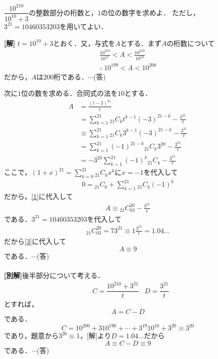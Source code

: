 \documentclass[a4j]{jarticle}
\begin{document}

     \begin{oframed}
     $\dfrac{10^{210}}{10^10+3}$の整数部分の桁数と，$1$の位の数字を求めよ．
     ただし，$3^{21}=10460353203$を用いてよい．
     \end{oframed}

\setlength{\columnseprule}{0.4pt}
\begin{multicols}{2}
{\bf[解]} $t=10^{10}+3$とおく．又，与式を$A$とする．まず$A$の桁数について
     \begin{align*}
     \frac{10^{210}}{10^{11}}<A<\frac{10^{210}}{10^{10}} \\
     \therefore \,10^{199}<A<10^{200}
     \end{align*}
だから，$A$は$200$桁である．$\cdots$(答)

次に$1$位の数を求める．合同式の法を$10$とする．
     \begin{align*}
     A&=\frac{(t-3)^{21}}{t}     \\
     &=\sum_{k=1}^{21}{}_{21}C_kt^{k-1}(-3)^{21-k}-\frac{3^21}{t} \\
     &\equiv \sum_{k=1}^{21}{}_{21}C_k3^{k-1}(-3)^{21-k}-\frac{3^21}{t} \tag{$\because t\equiv 3$}\\
     &=\sum_{k=1}^{21}(-1)^{21-k}{}_{21}C_k3^{20}-\frac{3^21}{t} \\
     &=-3^{20}\sum_{k=1}^{21}(-1)^{k}{}_{21}C_k-\frac{3^21}{t}\tag{1}\label{1}
     \end{align*}
ここで，$(1+x)^{21}=\sum_{k=0}^{21}{}_{21}C_kx^k$に$x=-1$を代入して
     \begin{align*}
     0={}_{21}C_0+\sum_{k=1}^{21}{}_{21}C_k(-1)^k
     \end{align*}
だから，\eqref{1}に代入して
     \begin{align*}
     A\equiv {}_{21}C_03^{20}-\frac{3^21}{t}\tag{2}\label{3}
     \end{align*}     
である．$3^{21}=10460353203$を代入して
     \begin{align*}
     {}_{21}C_03^{20}=73^{21}\equiv 1
     \frac{3^21}{t}=1.04\dots
     \end{align*}
だから\eqref{3}に代入して
     \[A\equiv9\]
である．$\cdots$(答)
 \\
 \\
{\bf[別解]}後半部分について考える．
     \begin{align*}
     &C=\dfrac{10^{210}+3^{21}}{t} &D=\dfrac{3^21}{t}
     \end{align*}
とすれば，
     \[A=C-D\]
である．
     \[C=10^{200}+310^{190}+\cdots+3^{19}10^{10}+3^{20}\equiv 3^{20}\]
であり，題意から$3^{20}\equiv 1$，[解]より$D=1.04\dots$だから
     \[A\equiv C-D\equiv 9\]
である．$\cdots$(答)           

     
\newpage
\end{multicols}
\end{document}
